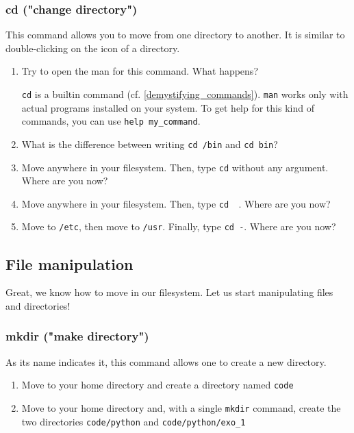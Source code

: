 \documentclass[12pt]{article}
\begin{document}
\subsubsection{cd ("change directory")}

This command allows you to move from one directory to another. It is similar to double-clicking on the icon of a directory.


\begin{enumerate}
\item Try to open the man for this command. What happens?

\texttt{cd} is a builtin command (cf. \ref{demystifying_commands}). \texttt{man} works only with actual programs installed on your system. To get help for this kind of commands,
you can use \texttt{help my\_command}.
\item What is the difference between writing \texttt{cd /bin} and \texttt{cd bin}?
\item Move anywhere in your filesystem. Then, type \texttt{cd} without any argument. Where are you now?
\item Move anywhere in your filesystem. Then, type \texttt{cd ~}. Where are you now?
\item Move to \texttt{/etc}, then move to \texttt{/usr}. Finally, type \texttt{cd -}. Where are you now?
\end{enumerate}


\subsection{File manipulation}

Great, we know how to move in our filesystem. Let us start manipulating files and directories!

\subsubsection{mkdir ("make directory")}

As its name indicates it, this command allows one to create a new directory.
\begin{enumerate}
\item Move to your home directory and create a directory named \texttt{code}
\item Move to your home directory and, with a single \texttt{mkdir} command, create the two directories \texttt{code/python} and \texttt{code/python/exo\_1}
\end{enumerate}
\end{document}
